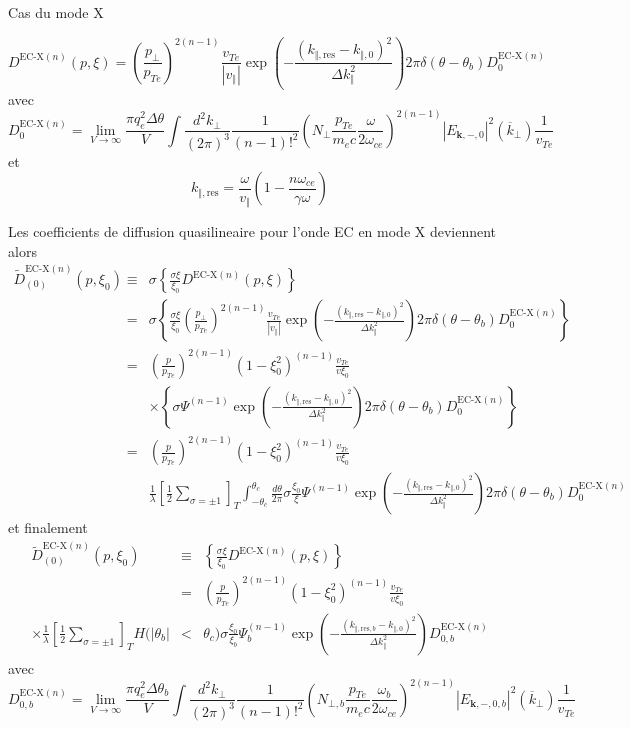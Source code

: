 Cas du mode X

\[
D^{\text{EC-X}(n)}(p,\xi)=\left(\frac{p_{\bot}}{p_{Te}}\right)^{2(n-1)}\frac{v_{Te}}{\left|v_{\Vert}\right|}\exp\left(-\frac{\left(k_{\Vert,\text{res}}-k_{\Vert,0}\right)^{2}}{\Delta k_{\Vert}^{2}}\right)2\pi\delta(\theta-\theta_{b})D_{0}^{\text{EC-X}(n)}\]
 avec \[
D_{0}^{\text{EC-X}(n)}=\lim_{V\rightarrow\infty}\frac{\pi q_{e}^{2}\Delta\theta}{V}\int\frac{d^{2}k_{\bot}}{(2\pi)^{3}}\frac{1}{(n-1)!^{2}}\left(N_{\bot}\frac{p_{Te}}{m_{e}c}\frac{\omega}{2\omega_{ce}}\right)^{2(n-1)}\left|E_{\mathbf{k},-,0}\right|^{2}(\overline{k}_{\bot})\frac{1}{v_{Te}}\]
 et \[
k_{\Vert,\text{res}}=\frac{\omega}{v_{\Vert}}\left(1-\frac{n\omega_{ce}}{\gamma\omega}\right)\]


Les coefficients de diffusion quasilineaire pour l'onde EC en mode
X deviennent alors \begin{eqnarray*}
\widetilde{D}_{(0)}^{\text{EC-X}(n)}(p,\xi_{0}) & \equiv & \sigma\left\{ \frac{\sigma\xi}{\xi_{0}}D^{\text{EC-X}(n)}(p,\xi)\right\} \\
 & = & \sigma\left\{ \frac{\sigma\xi}{\xi_{0}}\left(\frac{p_{\bot}}{p_{Te}}\right)^{2(n-1)}\frac{v_{Te}}{\left|v_{\Vert}\right|}\exp\left(-\frac{\left(k_{\Vert,\text{res}}-k_{\Vert,0}\right)^{2}}{\Delta k_{\Vert}^{2}}\right)2\pi\delta(\theta-\theta_{b})D_{0}^{\text{EC-X}(n)}\right\} \\
 & = & \left(\frac{p}{p_{Te}}\right)^{2(n-1)}\left(1-\xi_{0}^{2}\right)^{(n-1)}\frac{v_{Te}}{v\xi_{0}}\\
 &  & \times\left\{ \sigma\Psi^{(n-1)}\exp\left(-\frac{\left(k_{\Vert,\text{res}}-k_{\Vert,0}\right)^{2}}{\Delta k_{\Vert}^{2}}\right)2\pi\delta(\theta-\theta_{b})D_{0}^{\text{EC-X}(n)}\right\} \\
 & = & \left(\frac{p}{p_{Te}}\right)^{2(n-1)}\left(1-\xi_{0}^{2}\right)^{(n-1)}\frac{v_{Te}}{v\xi_{0}}\\
 &  & \frac{1}{\lambda}\left[\frac{1}{2}\sum_{\sigma=\pm1}\right]_{T}\int_{-\theta_{c}}^{\theta_{c}}\frac{d\theta}{2\pi}\sigma\frac{\xi_{0}}{\xi}\Psi^{(n-1)}\exp\left(-\frac{\left(k_{\Vert,\text{res}}-k_{\Vert,0}\right)^{2}}{\Delta k_{\Vert}^{2}}\right)2\pi\delta(\theta-\theta_{b})D_{0}^{\text{EC-X}(n)}\end{eqnarray*}
 et finalement \begin{eqnarray*}
\widetilde{D}_{(0)}^{\text{EC-X}(n)}(p,\xi_{0}) & \equiv & \left\{ \frac{\sigma\xi}{\xi_{0}}D^{\text{EC-X}(n)}(p,\xi)\right\} \\
 & = & \left(\frac{p}{p_{Te}}\right)^{2(n-1)}\left(1-\xi_{0}^{2}\right)^{(n-1)}\frac{v_{Te}}{v\xi_{0}}\\
\times\frac{1}{\lambda}\left[\frac{1}{2}\sum_{\sigma=\pm1}\right]_{T}H(|\theta_{b}| & < & \theta_{c})\sigma\frac{\xi_{0}}{\xi_{b}}\Psi_{b}^{(n-1)}\exp\left(-\frac{\left(k_{\Vert,\text{res},b}-k_{\Vert,0}\right)^{2}}{\Delta k_{\Vert}^{2}}\right)D_{0,b}^{\text{EC-X}(n)}\end{eqnarray*}
 avec \[
D_{0,b}^{\text{EC-X}(n)}=\lim_{V\rightarrow\infty}\frac{\pi q_{e}^{2}\Delta\theta_{b}}{V}\int\frac{d^{2}k_{\bot}}{(2\pi)^{3}}\frac{1}{(n-1)!^{2}}\left(N_{\bot,b}\frac{p_{Te}}{m_{e}c}\frac{\omega_{b}}{2\omega_{ce}}\right)^{2(n-1)}\left|E_{\mathbf{k},-,0,b}\right|^{2}(\overline{k}_{\bot})\frac{1}{v_{Te}}\]


